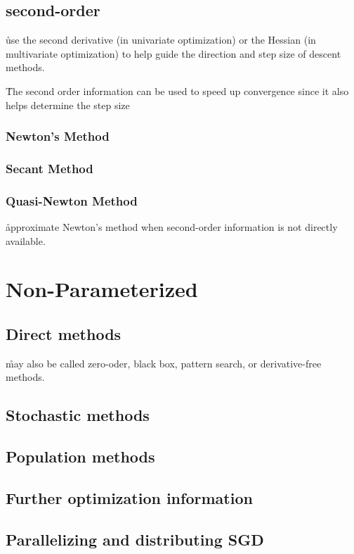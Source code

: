 \subsection{second-order}

\r{use the second derivative (in univariate optimization) or the Hessian (in multivariate optimization) to help guide the direction and step size of descent methods.}

\r{The second order information can be used to speed up convergence since it also helps determine the step size}

\subsubsection{Newton's Method}

\subsubsection{Secant Method}

\subsubsection{Quasi-Newton Method}

\r{approximate Newton's method when second-order information is not directly available.}

\section{Non-Parameterized}

\subsection{Direct methods}

\r{may also be called zero-oder, black box, pattern search, or derivative-free methods.}

\subsection{Stochastic methods}

\subsection{Population methods}

\subsection{Further optimization information}


\subsection{Parallelizing and distributing SGD}


